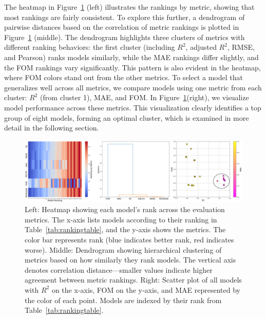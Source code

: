 \documentclass{ucdgradtaughtthesis}
\begin{document}
The heatmap in Figure~\ref{fig:CV_sidebyside} (left) illustrates the rankings by metric, showing that most rankings are fairly consistent. To explore this further, a dendrogram of pairwise distances based on the correlation of metric rankings is plotted in Figure~\ref{fig:CV_sidebyside} (middle).
The dendrogram highlights three clusters of metrics with different ranking behaviors: the first cluster (including \(R^2\), adjusted \(R^2\), RMSE, and Pearson) ranks models similarly, while the MAE rankings differ slightly, 
and the FOM rankings vary significantly. This pattern is also evident in the heatmap, where FOM colors stand out from the other metrics.
To select a model that generalizes well across all metrics, we compare models using one metric from each cluster: \(R^2\) (from cluster 1), MAE, and FOM. 
In Figure~\ref{fig:CV_sidebyside}(right), we visualize model performance across these metrics. This visualization clearly identifies a top group of eight models, forming an optimal cluster, which is examined in more detail in the following section.
\begin{figure}[H]
    \centering
    \includegraphics[width=\textwidth]{LatexPlots/CV_plots/ranking_visualisation.png}
    \caption[Visualising the ranking of each model after cross validation.]{Left: Heatmap showing each model’s rank across the evaluation metrics. The x-axis lists models according to their ranking in Table~\ref{tab:rankingtable}, and the y-axis shows the metrics. The color bar represents rank (blue indicates better rank, red indicates worse). 
    Middle: Dendrogram showing hierarchical clustering of metrics based on how similarly they rank models. The vertical axis denotes correlation distance—smaller values indicate higher agreement between metric rankings.
    Right: Scatter plot of all models with \(R^2\) on the x-axis, FOM on the y-axis, and MAE represented by the color of each point. Models are indexed by their rank from Table~\ref{tab:rankingtable}.}
    \label{fig:CV_sidebyside}
\end{figure}
\end{document}
